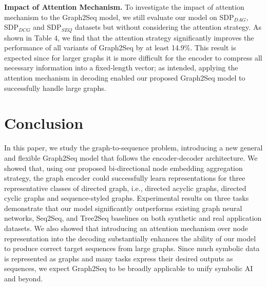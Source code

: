 \documentclass{article} \usepackage{iclr2019_conference,times}
\begin{document}
\textbf{Impact of Attention Mechanism.}
To investigate the impact of attention mechanism to the Graph2Seq model, we still evaluate our model on SDP$_{DAG}$, SDP$_{DCG}$ and SDP$_{SEQ}$ datasets but without considering the attention strategy. 
As shown in Table 4, we find that the attention strategy significantly improves the performance of all variants of Graph2Seq by at least 14.9\%. This result is expected since for larger graphs it is more difficult for the encoder to compress all necessary information into a fixed-length vector; as intended, applying the attention mechanism in decoding enabled our proposed Graph2Seq model to successfully handle large graphs.




\vspace{-0.1cm}
\section{Conclusion}
In this paper, we study the graph-to-sequence problem, introducing a new general and flexible Graph2Seq model that follows
the encoder-decoder architecture.
We showed that, using our proposed bi-directional node embedding aggregation strategy, the graph encoder could successfully learn representations for three representative classes of directed graph, i.e., directed acyclic graphs, directed cyclic graphs and sequence-styled graphs.
Experimental results on three tasks demonstrate that our model significantly outperforms existing graph neural networks, Seq2Seq, and Tree2Seq baselines on both synthetic and real application datasets.
We also showed that introducing an attention mechanism over node representation into the decoding substantially enhances the ability of our model to produce correct target sequences from large graphs.
Since much symbolic data is represented as graphs and many tasks express their desired outputs as sequences, we expect Graph2Seq to be broadly applicable to unify symbolic AI and beyond.




\clearpage
\newpage




\clearpage
\appendix
\end{document}
